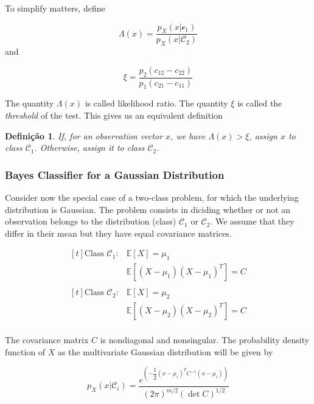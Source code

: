 \documentclass[twocolumn]{article}
\newtheorem{definicao}{Definição}[section]
\begin{document}
		 To simplify matters, define


		 $$ \Lambda (x) = \dfrac{p_{X} (x | \mathcal{c}_{1})}{ p_{X} (x | \mathcal{C}_{2})} $$
		 \noindent and

		 $$ \xi = \dfrac{p_{2} (c_{12} - c_{22})}{p_{1} (c_{21} - c_{11})} $$

		 The quantity $ \Lambda (x) $ is called likelihood ratio. The quantity $ \xi $ is called the \textit{threshold} of the test. This gives us an equivalent definition

		 \begin{definicao}
			 If, for an observation vector $ x $, we have $ \Lambda (x) > \xi $, assign $ x $ to class $ \mathcal{C}_{1} $. Otherwise, assign it to class $ \mathcal{C}_{2} $.
		 \end{definicao}

	 \subsubsection{Bayes Classifier for a Gaussian Distribution}
		 Consider now the special case of a two-class problem, for which the underlying distribution is Gaussian. The problem consists in diciding whether or not an observation belongs to the distribution (class) $ \mathcal{C}_{1} $ or $ \mathcal{C}_{2} $. We assume that they differ in their mean but they have equal covariance matrices.

		 $$ \begin{aligned}[t]
				 \text{Class } \mathcal{C}_{1}: & \mathbb{E} [X] = \mu_{1}                          \\
				                                & \mathbb{E} [ (X - \mu_{1}) (X - \mu_{1})^{T}] = C \\
			 \end{aligned} $$
		 $$ \begin{aligned}[t]
				 \text{Class } \mathcal{C}_{2}: & \mathbb{E} [X] = \mu_{2}                          \\
				                                & \mathbb{E} [ (X - \mu_{2}) (X - \mu_{2})^{T}] = C \\
			 \end{aligned} $$

		 The covariance matrix $ C $ is nondiagonal and nonsingular. The probability density function of $ X $ as the multivariate Gaussian distribution will be given by

		 $$ p_{X} (x | \mathcal{C}_{i}) = \dfrac{ e^{\left( -\dfrac{1}{2} (x - \mu_{i})^{T}C^{-1} (x - \mu_{i})\right)}}{ (2\pi)^{m/2} (\det C)^{1/2}} $$
\end{document}
